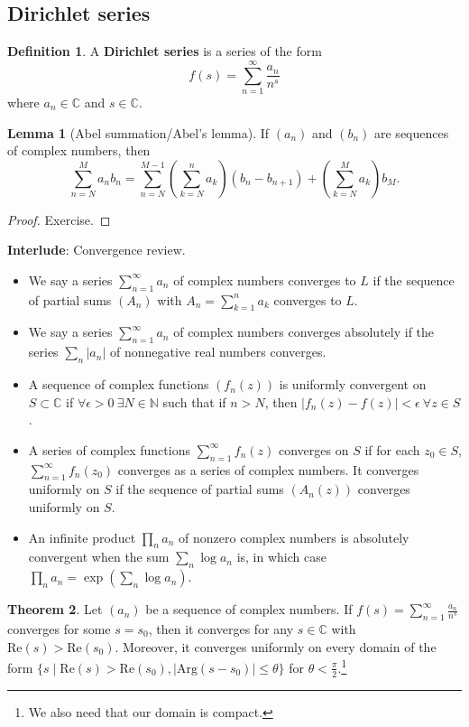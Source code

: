 \documentclass{article}
\theoremstyle{definition}
\newtheorem{theorem}{Theorem}[section]
\newtheorem{lemma}[theorem]{Lemma}
\newtheorem{defn}{Definition}[section]
\begin{document}
\subsection{Dirichlet series}
\begin{defn}\label{defn2.1}
    A \textbf{Dirichlet series} is a series of the form \[
    f(s) = \sum_{n=1}^{\infty} \frac{a_n}{n^s}
    \]
    where $a_n \in \mathbb{C}$ and $s \in \mathbb{C}$.
\end{defn}
\begin{lemma}[Abel summation/Abel's lemma]\label{lemma2.2}
    If $(a_n)$ and $(b_n)$ are sequences of complex numbers, then \[
    \sum_{n=N}^{M} a_nb_n = \sum_{n=N}^{M-1} \left(\sum_{k=N}^{n} a_k\right)(b_n-b_{n+1}) + \left(\sum_{k=N}^{M} a_k \right)b_M. 
    \]
\end{lemma}
\begin{proof}
    Exercise.
\end{proof}
\textbf{Interlude}: Convergence review.
\begin{itemize}
    \item We say a series $\sum_{n=1}^{\infty} a_n$ of complex numbers converges to $L$ if the sequence of partial sums $(A_n)$ with $A_n = \sum_{k=1}^{n} a_k$ converges to $L$.
    \item We say a series $\sum_{n=1}^{\infty} a_n$ of complex numbers converges absolutely if the series $\sum_{n}^{} \left|a_n\right|$ of nonnegative real numbers converges.
    \item A sequence of complex functions $(f_n(z))$ is uniformly convergent on $S \subset \mathbb{C}$ if $\forall \epsilon>0 ~ \exists N \in \mathbb{N}$ such that if $n>N$, then $\left|f_n(z) - f(z)\right|<\epsilon ~\forall z \in S$. 
    \item A series of complex functions $\sum_{n=1}^{\infty} f_n(z)$ converges on $S$ if for each $z_0 \in S$, $\sum_{n=1}^{\infty} f_n(z_0)$ converges as a series of complex numbers. It converges uniformly on $S$ if the sequence of partial sums $(A_n(z))$ converges uniformly on $S$.
    \item An infinite product $\prod_{n}^{} a_n$ of nonzero complex numbers is absolutely convergent when the sum $\sum_{n}^{} \log a_n$ is, in which case $\prod_{n}^{} a_n = \exp (\sum_{n}^{} \log a_n)$.
\end{itemize}
\begin{theorem}\label{theorem2.3}
    Let $(a_n)$ be a sequence of complex numbers. If $f(s) = \sum_{n=1}^{\infty} \frac{a_n}{n^s}$ converges for some $s=s_0$, then it converges for any $s \in \mathbb{C}$ with $\text{Re}(s)>\text{Re}(s_0)$. Moreover, it converges uniformly on every domain of the form $\{s \mid \text{Re}(s)>\text{Re}(s_0), \left|\text{Arg}(s-s_0)\right|\le \theta\}$ for $\theta < \frac{\pi}{2}$.\footnote{We also need that our domain is compact.}
\end{theorem}
\end{document}
